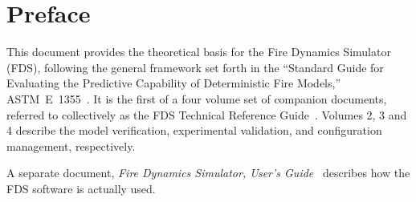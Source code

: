 \documentclass[11pt]{book}
\begin{document}
\begin{minipage}[t][9in][s]{6.5in}


\vspace{3in}

\large
{}

\vfill

\hspace{1in}

\end{minipage}



\newpage

\frontmatter

\pagestyle{plain}



\chapter{Preface}

This document provides the theoretical basis for the Fire Dynamics Simulator (FDS), following the general framework set forth in the ``Standard Guide for Evaluating the Predictive Capability of Deterministic Fire Models,'' ASTM~E~1355~\cite{ASTM:E1355}. It is the first of a four volume set of companion documents, referred to collectively as the FDS Technical Reference Guide~\cite{FDS_Tech_Guide}. Volumes 2, 3 and 4 describe the model verification, experimental validation, and configuration management, respectively.

A separate document, {\em Fire Dynamics Simulator, User's Guide}~\cite{FDS_Users_Guide} describes how the FDS software is actually used.
\end{document}
